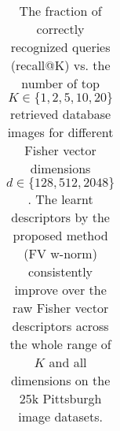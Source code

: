\begin{table}[t!]
\begin{centering}
\begin{tabularx}{0.89\linewidth}{|l|c c c c c|}
	\end{tabularx}
	\caption{ \textcolor{myRed}{}
The fraction of correctly recognized queries (recall@K) vs. the number of top $K\in\{1,2,5,10,20\}$ retrieved database images for different Fisher vector dimensions $d\in\{128,512,2048\}$. The learnt descriptors by the proposed method (FV w-norm) consistently improve over the raw Fisher vector descriptors across the whole range of $K$ and all dimensions on the 25k Pittsburgh image datasets.		
}
\label{tab:recall01}
\end{centering}
\end{table}
